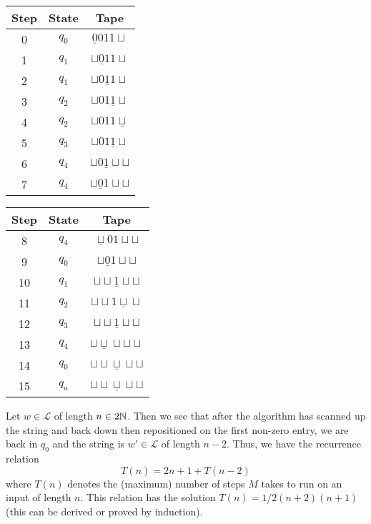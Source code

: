 \begin{center}
  \begin{tabular}{ccc}
    \toprule
    Step & State & Tape                             \\
    \midrule
    0    & $q_0$ & $\underline0011\sqcup$           \\
    1    & $q_1$ & $\sqcup\underline011\sqcup$      \\
    2    & $q_1$ & $\sqcup0\underline11\sqcup$      \\
    3    & $q_2$ & $\sqcup01\underline1\sqcup$      \\
    4    & $q_2$ & $\sqcup011\underline\sqcup$      \\
    5    & $q_3$ & $\sqcup01\underline1\sqcup$      \\
    6    & $q_4$ & $\sqcup0\underline1\sqcup\sqcup$ \\
    7    & $q_4$ & $\sqcup\underline01\sqcup\sqcup$ \\
    \bottomrule
  \end{tabular}
  \hspace{2em}
  \begin{tabular}{ccc}
    \toprule
    Step & State & Tape                                       \\
    \midrule
    8    & $q_4$ & $\underline\sqcup01\sqcup\sqcup$           \\
    9   & $q_0$ & $\sqcup\underline01\sqcup\sqcup$           \\
    10   & $q_1$ & $\sqcup\sqcup\underline1\sqcup\sqcup$      \\
    11   & $q_2$ & $\sqcup\sqcup1\underline\sqcup\sqcup$      \\
    12   & $q_3$ & $\sqcup\sqcup\underline1\sqcup\sqcup$      \\
    13   & $q_4$ & $\sqcup\underline\sqcup\sqcup\sqcup\sqcup$ \\
    14   & $q_0$ & $\sqcup\sqcup\underline\sqcup\sqcup\sqcup$ \\
    15   & $q_a$ & $\sqcup\sqcup\underline\sqcup\sqcup\sqcup$ \\
    \bottomrule
  \end{tabular}
\end{center}

Let $w \in \mathcal L$ of length $n \in 2\mathbb N$. Then we see that after the algorithm has scanned up the string and back down then repositioned on the first non-zero entry, we are back in $q_0$ and the string is $w' \in \mathcal L$ of length $n-2$. Thus, we have the recurrence relation 
\[T(n) = 2n +1 + T(n-2)\]
where $T(n)$ denotes the (maximum) number of steps $M$ takes to run on an input of length $n$. This relation has the solution $T(n) = 1/2(n+2)(n+1)$ (this can be derived or proved by induction). 

